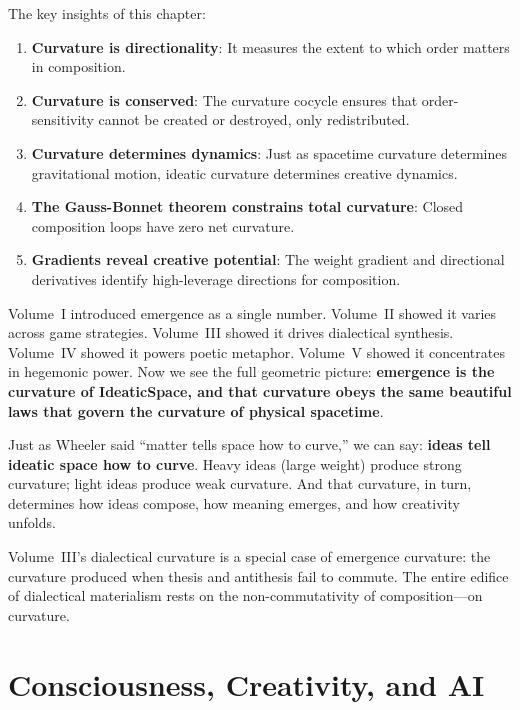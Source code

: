 The key insights of this chapter:

\begin{enumerate}
  \item \textbf{Curvature is directionality}: It measures the extent to which
    order matters in composition.
  \item \textbf{Curvature is conserved}: The curvature cocycle ensures that
    order-sensitivity cannot be created or destroyed, only redistributed.
  \item \textbf{Curvature determines dynamics}: Just as spacetime curvature
    determines gravitational motion, ideatic curvature determines creative
    dynamics.
  \item \textbf{The Gauss-Bonnet theorem constrains total curvature}: Closed
    composition loops have zero net curvature.
  \item \textbf{Gradients reveal creative potential}: The weight gradient and
    directional derivatives identify high-leverage directions for composition.
\end{enumerate}

Volume~I introduced emergence as a single number. Volume~II showed it varies
across game strategies. Volume~III showed it drives dialectical synthesis.
Volume~IV showed it powers poetic metaphor. Volume~V showed it concentrates
in hegemonic power. Now we see the full geometric picture: \textbf{emergence
is the curvature of IdeaticSpace, and that curvature obeys the same beautiful
laws that govern the curvature of physical spacetime}.

Just as Wheeler said ``matter tells space how to curve,'' we can say:
\textbf{ideas tell ideatic space how to curve}. Heavy ideas (large weight)
produce strong curvature; light ideas produce weak curvature. And that
curvature, in turn, determines how ideas compose, how meaning emerges, and
how creativity unfolds.

Volume~III's dialectical curvature is a special case of emergence curvature:
the curvature produced when thesis and antithesis fail to commute. The entire
edifice of dialectical materialism rests on the non-commutativity of
composition---on curvature.



\chapter{Consciousness, Creativity, and AI}
\label{ch:consciousness}

